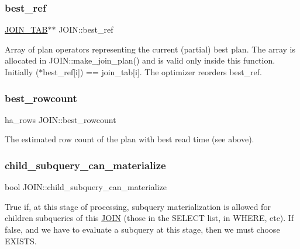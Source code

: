 \subsubsection{\texorpdfstring{best\+\_\+ref}{best\_ref}}
{\footnotesize\ttfamily \mbox{\hyperlink{classJOIN__TAB}{J\+O\+I\+N\+\_\+\+T\+AB}}$\ast$$\ast$ J\+O\+I\+N\+::best\+\_\+ref}

Array of plan operators representing the current (partial) best plan. The array is allocated in J\+O\+I\+N\+::make\+\_\+join\+\_\+plan() and is valid only inside this function. Initially ($\ast$best\+\_\+ref\mbox{[}i\mbox{]}) == join\+\_\+tab\mbox{[}i\mbox{]}. The optimizer reorders best\+\_\+ref. \mbox{\label{classJOIN_af4191f65d4fe5d1c0ddf5e7d1065b3c2}} 
\subsubsection{\texorpdfstring{best\+\_\+rowcount}{best\_rowcount}}
{\footnotesize\ttfamily ha\+\_\+rows J\+O\+I\+N\+::best\+\_\+rowcount}

The estimated row count of the plan with best read time (see above). \mbox{\label{classJOIN_a2a6bdffc54ec0343c81cf6c7e17e220a}} 
\subsubsection{\texorpdfstring{child\+\_\+subquery\+\_\+can\+\_\+materialize}{child\_subquery\_can\_materialize}}
{\footnotesize\ttfamily bool J\+O\+I\+N\+::child\+\_\+subquery\+\_\+can\+\_\+materialize}

True if, at this stage of processing, subquery materialization is allowed for children subqueries of this \mbox{\hyperlink{classJOIN}{J\+O\+IN}} (those in the S\+E\+L\+E\+CT list, in W\+H\+E\+RE, etc). If false, and we have to evaluate a subquery at this stage, then we must choose E\+X\+I\+S\+TS. \mbox{\label{classJOIN_a547b3eff0d36ad2366592b7fd575cd88}} 
